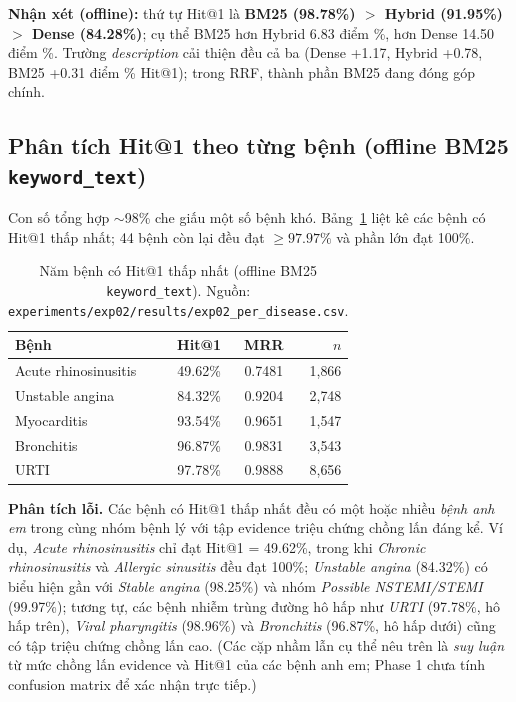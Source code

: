 \textbf{Nhận xét (offline):} thứ tự Hit@1 là \textbf{BM25 (98.78\%) $>$ Hybrid (91.95\%) $>$ Dense (84.28\%)}; cụ thể BM25 hơn Hybrid 6.83 điểm \%, hơn Dense 14.50 điểm \%. Trường \textit{description} cải thiện đều cả ba (Dense +1.17, Hybrid +0.78, BM25 +0.31 điểm \% Hit@1); trong RRF, thành phần BM25 đang đóng góp chính.

\subsection{Phân tích Hit@1 theo từng bệnh (offline BM25 \texttt{keyword\_text})}
Con số tổng hợp $\sim$98\% che giấu một số bệnh khó. Bảng~\ref{tab:perdisease} liệt kê các bệnh có Hit@1 thấp nhất; 44 bệnh còn lại đều đạt $\ge 97.97\%$ và phần lớn đạt 100\%.

\begin{table}[H]
  \centering
  \small
  \caption{Năm bệnh có Hit@1 thấp nhất (offline BM25 \texttt{keyword\_text}). Nguồn: \texttt{experiments/exp02/results/exp02\_per\_disease.csv}.}
  \label{tab:perdisease}
  \begin{tabular}{lccr}
    \toprule
    \textbf{Bệnh}        & \textbf{Hit@1} & \textbf{MRR} & \textbf{$n$} \\
    \midrule
    Acute rhinosinusitis & 49.62\%        & 0.7481       & 1{,}866      \\
    Unstable angina      & 84.32\%        & 0.9204       & 2{,}748      \\
    Myocarditis          & 93.54\%        & 0.9651       & 1{,}547      \\
    Bronchitis           & 96.87\%        & 0.9831       & 3{,}543      \\
    URTI                 & 97.78\%        & 0.9888       & 8{,}656      \\
    \bottomrule
  \end{tabular}
\end{table}

\textbf{Phân tích lỗi.} Các bệnh có Hit@1 thấp nhất đều có một hoặc nhiều \textit{bệnh anh em} trong cùng nhóm bệnh lý với tập evidence triệu chứng chồng lấn đáng kể. Ví dụ, \textit{Acute rhinosinusitis} chỉ đạt Hit@1 = 49.62\%, trong khi \textit{Chronic rhinosinusitis} và \textit{Allergic sinusitis} đều đạt 100\%; \textit{Unstable angina} (84.32\%) có biểu hiện gần với \textit{Stable angina} (98.25\%) và nhóm \textit{Possible NSTEMI/STEMI} (99.97\%); tương tự, các bệnh nhiễm trùng đường hô hấp như \textit{URTI} (97.78\%, hô hấp trên), \textit{Viral pharyngitis} (98.96\%) và \textit{Bronchitis} (96.87\%, hô hấp dưới) cũng có tập triệu chứng chồng lấn cao. (Các cặp nhầm lẫn cụ thể nêu trên là \textit{suy luận} từ mức chồng lấn evidence và Hit@1 của các bệnh anh em; Phase 1 chưa tính confusion matrix để xác nhận trực tiếp.)

